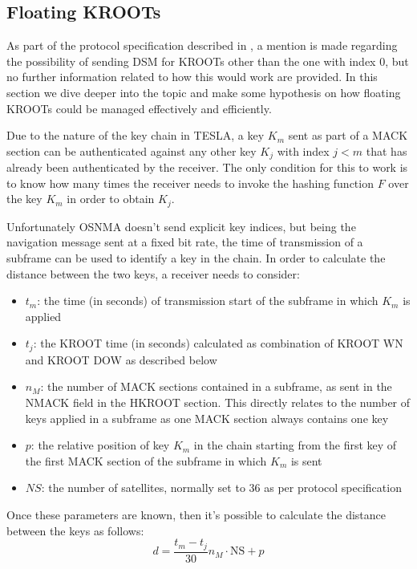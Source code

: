 \subsection{Floating KROOTs}
As part of the protocol specification described in \cite{osnma}, a mention
is made regarding the possibility of sending DSM for KROOTs other than the one
with index $0$, but no further information related to how this would work are
provided. In this section we dive deeper into the topic and make some hypothesis
on how floating KROOTs could be managed effectively and efficiently.

Due to the nature of the key chain in TESLA, a key $K_m$ sent as part of a MACK
section can be authenticated against any other key $K_j$ with index $j < m$ that
has already been authenticated by the receiver. The only condition for this to
work is to know how many times the receiver needs to invoke the hashing function
$F$ over the key $K_m$ in order to obtain $K_j$.

Unfortunately OSNMA doesn't send explicit key indices, but being the navigation
message sent at a fixed bit rate, the time of transmission of a subframe can
be used to identify a key in the chain. In order to calculate the distance
between the two keys, a receiver needs to consider:
\begin{itemize}
  \item $t_m$: the time (in seconds) of transmission start of the subframe in
    which $K_m$ is applied
  \item $t_j$: the KROOT time (in seconds) calculated as combination of KROOT WN
    and KROOT DOW as described below
  \item $n_M$: the number of MACK sections contained in a subframe, as sent in
    the \textrm{NMACK} field in the HKROOT section. This directly relates to the
    number of keys applied in a subframe as one MACK section always contains one
    key
  \item $p$: the relative position of key $K_m$ in the chain starting from the
    first key of the first MACK section of the subframe in which $K_m$ is sent
  \item $NS$: the number of satellites, normally set to 36 as per protocol
    specification
\end{itemize}
Once these parameters are known, then it's possible to calculate the distance
between the keys as follows:
\begin{equation}
  \label{eq:d}
  d = \frac{t_m - t_j}{30} n_M \cdot \textrm{NS} + p
\end{equation}

